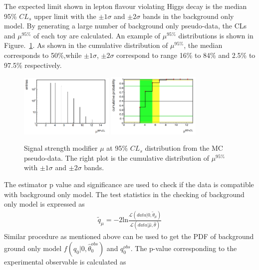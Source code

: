 The expected limit shown in lepton flavour violating Higgs decay is the median 95\% $CL_{s}$ upper limit with the $\pm 1 \sigma$ and $\pm 2 \sigma$ bands in the background only model. By generating a large number of background only pseudo-data, the CLs and $\mu^{95\%}$ of each toy are calculated. An example of $\mu^{95\%}$ distributions is shown in Figure.~\ref{fig:Signal_strength_example}. As shown in the cumulative distribution of $\mu^{95\%}$, the median corresponds to 50\%,while $\pm 1 \sigma$, $\pm 2 \sigma$  correspond to range 16\% to 84\% and 2.5\% to 97.5\% respectively.     
\begin{figure}[!tbp] 
\centering
\includegraphics[width=0.4\textwidth]{chapter7/Signal_strength_example_1.png}
\includegraphics[width=0.4\textwidth]{chapter7/Signal_strength_example_2.png}
\caption[Signal strength modifier distribution of the MC pseudo-data]{Signal strength modifier $\mu$ at 95\% $CL_{s}$ distribution from the MC pseudo-data. The right plot is the cumulative distribution of $\mu^{95\%}$ with $\pm 1 \sigma$ and $\pm 2 \sigma$ bands.}
\label{fig:Signal_strength_example}
\end{figure}

The estimator p value and significance are used to check if the data is compatible with background only model. The test statistics in the checking of background only model is expressed as
\begin{align*}
\tilde{q}_{\mu}=-2\textrm{ln}\frac{\mathcal{L}(data|0,\tilde{\theta}_{\mu})}{\mathcal{L}(data|\hat{\mu},\hat{\theta})}
\end{align*}
Similar procedure as mentioned above can be used to get the PDF of background ground only model $f(q_{0}|0,\hat{\theta}^{obs}_{0})$ and $q^{obs}_{0}$. The p-value corresponding to the experimental observable is calculated as

